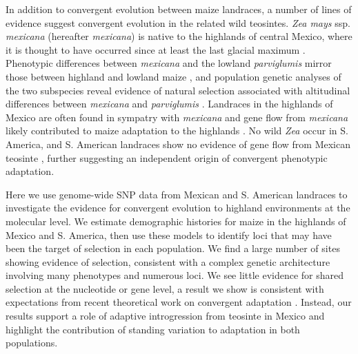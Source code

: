In addition to convergent evolution between maize landraces, a number of lines of evidence suggest convergent evolution in the related wild teosintes.  
\emph{Zea mays} ssp. \emph{mexicana} (hereafter \emph{mexicana}) is native to the highlands of central Mexico, where it is thought to have occurred since at least the last glacial maximum \cite[]{Ross-Ibarra_2009_19153259, Hufford_niche}. 
Phenotypic differences between \emph{mexicana} and the lowland \emph{parviglumis} mirror those between highland and lowland maize \cite[]{Lauter_2004_15342532}, and population genetic analyses of the two subspecies reveal evidence of natural selection associated with altitudinal differences between \emph{mexicana} and \emph{parviglumis} \cite[]{Pyhajarvi2013,fang2012megabase}.  
Landraces in the highlands of Mexico are often found in sympatry with \emph{mexicana} and gene flow from \emph{mexicana} likely contributed to maize adaptation to the highlands \cite[]{Profford_2013}. 
No wild \emph{Zea} occur in S. America, and S. American landraces show no evidence of gene flow from Mexican teosinte \cite[]{vanHeerwaarden_2011_21189301}, further suggesting an independent origin of convergent phenotypic adaptation.

Here we use genome-wide SNP data from Mexican and S. American landraces to investigate the evidence for convergent evolution to highland environments at the molecular level.  
We estimate demographic histories for maize in the highlands of Mexico and S. America, then use these models to identify loci that may have been the target of selection in each population.
We find a large number of sites showing evidence of selection, consistent with a complex genetic architecture involving many phenotypes and numerous loci.  
We see little evidence for shared selection at the nucleotide or gene level, a result we show is consistent with expectations from recent theoretical work on convergent adaptation \cite[]{ralph2014convergent}.
Instead, our results support a role of adaptive introgression from teosinte in Mexico and highlight the contribution of standing variation to adaptation in both populations.